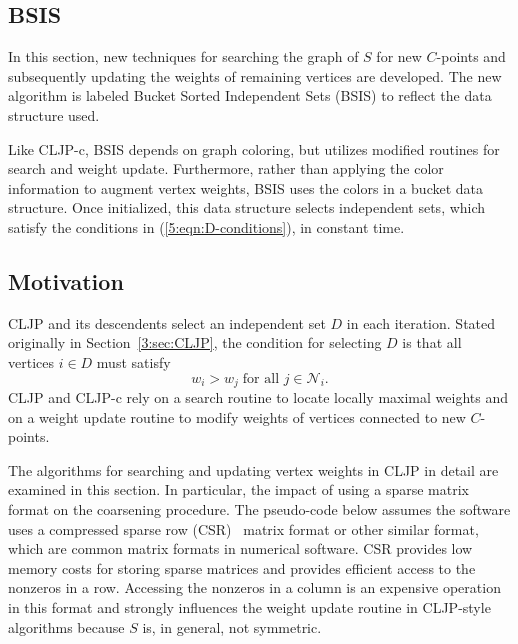 \documentclass{elsart}
\begin{document}
\subsection{BSIS}
\label{sec:bsis}
In this section, new techniques for searching the graph of $S$ for new
$C$-points and subsequently updating the weights of remaining vertices
are developed. The new algorithm is labeled Bucket Sorted Independent
Sets (BSIS) to reflect the data structure used.

Like CLJP-c, BSIS depends on graph coloring, but utilizes modified
routines for search and weight update. Furthermore, rather than
applying the color information to augment vertex weights, BSIS uses
the colors in a bucket data structure. Once initialized, this data
structure selects independent sets, which satisfy the conditions in
(\ref{5:eqn:D-conditions}), in constant time.

\subsection{Motivation}
\label{sec:motivation}
CLJP and its descendents select an independent set $D$ in each
iteration. Stated originally in Section~\ref{3:sec:CLJP}, the
condition for selecting $D$ is that all vertices $i \in D$ must
satisfy
\begin{equation}
\label{5:eqn:D-conditions}
w_i > w_j\;\textrm{for all } j \in \mathcal{N}_i.
\end{equation}
CLJP and CLJP-c rely on a search routine to locate locally maximal
weights and on a weight update routine to modify weights of vertices
connected to new $C$-points.

The algorithms for searching and updating vertex weights in CLJP in
detail are examined in this section. In particular, the impact of
using a sparse matrix format on the coarsening procedure. The
pseudo-code below assumes the software uses a compressed sparse row
(CSR)~\cite{saadBook} matrix format or other similar format, which are
common matrix formats in numerical software. CSR provides low memory
costs for storing sparse matrices and provides efficient access to the
nonzeros in a row. Accessing the nonzeros in a column is an expensive
operation in this format and strongly influences the weight update
routine in CLJP-style algorithms because $S$ is, in general, not
symmetric.
\end{document}
